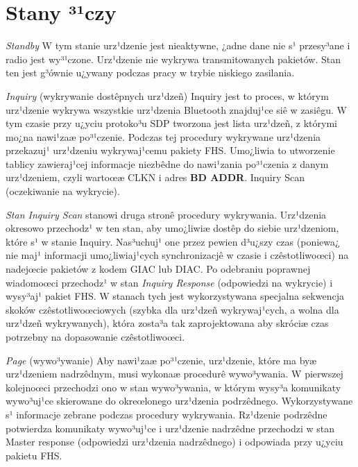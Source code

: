 \section{Stany ³¹czy}
 \emph{Standby} W tym stanie urz¹dzenie jest
nieaktywne, ¿adne dane nie s¹ przesy³ane i radio jest wy³¹czone.
Urz¹dzenie nie wykrywa transmitowanych pakietów. Stan ten jest
g³ównie u¿ywany podczas pracy w trybie niskiego zasilania.

\emph{Inquiry} (wykrywanie dostêpnych urz¹dzeñ) Inquiry jest to
proces, w którym urz¹dzenie wykrywa wszystkie urz¹dzenia Bluetooth
znajduj¹ce siê w zasiêgu. W tym czasie przy u¿yciu protoko³u SDP
tworzona jest lista urz¹dzeñ, z którymi mo¿na nawi¹zaæ po³¹czenie.
Podczas tej procedury wykrywane urz¹dzenia przekazuj¹ urz¹dzeniu
wykrywaj¹cemu pakiety FHS. Umo¿liwia to utworzenie tablicy
zawieraj¹cej informacje niezbêdne do nawi¹zania po³¹czenia z danym
urz¹dzeniem, czyli wartoœæ CLKN i adres \textbf{BD ADDR}. Inquiry
Scan (oczekiwanie na wykrycie).

\emph{Stan Inquiry Scan} stanowi druga stronê procedury wykrywania.
Urz¹dzenia okresowo przechodz¹ w ten stan, aby umo¿liwiæ dostêp do
siebie urz¹dzeniom, które s¹ w stanie Inquiry. Nas³uchuj¹ one przez
pewien d³u¿szy czas (poniewa¿ nie maj¹ informacji umo¿liwiaj¹cych
synchronizacjê w czasie i czêstotliwoœci) na nadejœcie pakietów z
kodem GIAC lub DIAC. Po odebraniu poprawnej wiadomoœci przechodz¹ w
stan \emph{Inquiry Response} (odpowiedzi na wykrycie) i wysy³aj¹
pakiet FHS. W stanach tych jest wykorzystywana specjalna sekwencja
skoków czêstotliwoœciowych (szybka dla urz¹dzeñ wykrywaj¹cych, a
wolna dla urz¹dzeñ wykrywanych), która zosta³a tak zaprojektowana
aby skróciæ czas potrzebny na dopasowanie czêstotliwoœci.

\emph{Page} (wywo³ywanie) Aby nawi¹zaæ po³¹czenie, urz¹dzenie, które
ma byæ urz¹dzeniem nadrzêdnym, musi wykonaæ procedurê wywo³ywania. W
pierwszej kolejnoœci przechodzi ono w stan wywo³ywania, w którym
wysy³a komunikaty wywo³uj¹ce skierowane do okreœlonego urz¹dzenia
podrzêdnego. Wykorzystywane s¹ informacje zebrane podczas procedury
wykrywania. Rz¹dzenie podrzêdne potwierdza komunikaty wywo³uj¹ce i
urz¹dzenie nadrzêdne przechodzi w stan Master response (odpowiedzi
urz¹dzenia nadrzêdnego) i odpowiada przy u¿yciu pakietu FHS.

